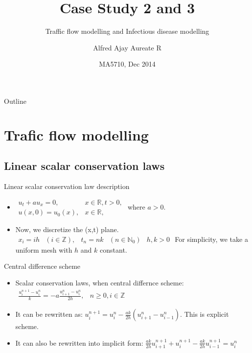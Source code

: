 \documentclass{beamer}
\title{Case Study 2 and 3}
\subtitle{Traffic flow modelling and Infectious disease modelling}
\author{Alfred Ajay Aureate R\inst{1}}
\institute[IITM] %
{
  \inst{1}%
  EE10B052\\
  Department of Electrical Engineering\\
  Indian Institute of Technology Madras}
\date{MA5710, Dec 2014}
\begin{document}
\begin{frame}
  \titlepage
\end{frame}

\begin{frame}{Outline}
  \tableofcontents
\end{frame}

\section{Trafic flow modelling}

\subsection{Linear scalar conservation laws}

\begin{frame}{Linear scalar conservation law description}
  \begin{itemize}
  \item {
    $\begin{array}{cc}
u_{t}+au_{x}=0, & x\in\mathbb{R},t>0,\\
u\left(x,0\right)=u_{0}\left(x\right), & x\in\mathbb{R},
\end{array}$
where $a>0$.
  }
  \item {
    Now, we discretize the (x,t) plane.
    $\begin{array}{ccccc}
x_{i}=ih & \left(i\in\mathbb{Z}\right), & t_{n}=nk & \left(n\in\mathbb{N}_{0}\right) & h,k>0\end{array}$
    For simplicity, we take a uniform mesh with $h$ and $k$ constant. 
  }
  \end{itemize}
\end{frame}

\begin{frame}{Central difference scheme}
  \begin{itemize}
  \item { Scalar conservation laws, when central differnce scheme:
    $\begin{array}{cc}
\frac{u_{i}^{n+1}-u_{i}^{n}}{k}=-a\frac{u_{i+1}^{n}-u_{i}^{n}}{2h}, & n\geq0,i\in\mathbb{Z}\end{array}$
    \pause %
  }
  \item {   
    It can be rewritten as: $u_{i}^{n+1}=u_{i}^{n}-\frac{ak}{2h}\left(u_{i+1}^{n}-u_{i-1}^{n}\right)$. This is explicit scheme.
    \pause
  }
  \item<3-> {
    It can also be rewritten into implicit form: $\frac{ak}{2h}u_{i+1}^{n+1}+u_{i}^{n+1}-\frac{ak}{2h}u_{i-1}^{n+1}=u_{i}^{n}$
  }
  \end{itemize}
\end{frame}
\end{document}
